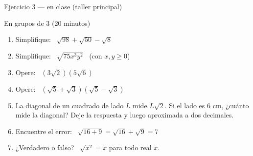 \documentclass[aspectratio=169,10pt]{beamer}
\begin{document}
\begin{frame}{Ejercicio 3 — en clase (taller principal)}
  \begin{alertblock}{En grupos de 3 (20 minutos)}
    \tiny
    \begin{enumerate}\setlength{\itemsep}{0.04cm}
      \item Simplifique: \ $\sqrt{98} + \sqrt{50} - \sqrt{8}$
      \item Simplifique: \ $\sqrt{75x^{3}y^{2}}$ \ (con $x,y \ge 0$)
      \item Opere: \ $\left(3\sqrt{2}\right)\left(5\sqrt{6}\right)$
      \item Opere: \ $\left(\sqrt{5}+\sqrt{3}\right)\left(\sqrt{5}-\sqrt{3}\right)$
      \item La diagonal de un cuadrado de lado $L$ mide $L\sqrt{2}$.
            Si el lado es 6 cm, ¿cuánto mide la diagonal? Deje la respuesta
             y luego aproximada a dos decimales.
      \item Encuentre el error: \ $\sqrt{16+9} = \sqrt{16}+\sqrt{9} = 7$
      \item ¿Verdadero o falso? \ $\sqrt{x^{2}} = x$ para todo real $x$.
    \end{enumerate}
  \end{alertblock}
\end{frame}
\end{document}
